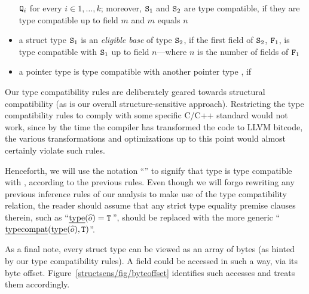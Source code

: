 \begin{itemize}[--]
  \(\texttt{Q}_i\) for every \(i \in 1,\ldots ,k\);
  moreover, \(\texttt{S}_1\) and \(\texttt{S}_2\) are type compatible, if they
  are type compatible up to field \(m\) and \(m\) equals \(n\)
\item a struct type \(\texttt{S}_1\) is an \emph{eligible base} of type
  \(\texttt{S}_2\), if the first field of \(\texttt{S}_2\), \(\texttt{F}_1\), is
  type compatible with \(\texttt{S}_1\) up to field \(n\)---where \(n\) is
  the number of fields of \(\texttt{F}_1\)%
\item a pointer type  is type compatible with another pointer
  type , if
\end{itemize}

Our type compatibility rules are deliberately geared towards
structural compatibility (as is our overall structure-sensitive
approach). Restricting the type compatibility rules to comply with some
specific C/C++ standard would not work, since by the time the compiler
has transformed the code to LLVM bitcode, the various transformations
and optimizations up to this point would almost certainly violate such
rules.

Henceforth, we will use the notation ``''
to signify that type  is type compatible with , according
to the previous rules. Even though we will forgo rewriting any
previous inference rules of our analysis to make use of the type
compatibility relation, the reader should assume that any strict type
equality premise clauses therein, such as
``\(\text{\emph{type}}(\widehat{o}) = \texttt{T}\)\,'', should be replaced with the more
generic ``\(\text{\emph{typecompat}}(\text{\emph{type}}(\widehat{o}), \texttt{T})\)''.

As a final note, every struct type can be viewed as an array of bytes
(as hinted by our type compatibility rules). A field could be accessed
in such a way, via its byte
offset. Figure~\ref{structsens/fig/byteoffset} identifies such
accesses and treats them accordingly.

